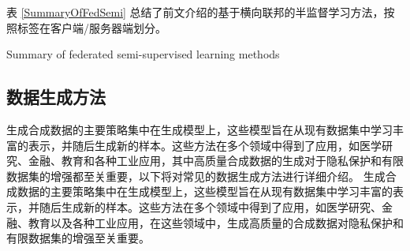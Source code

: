 表 \ref{SummaryOfFedSemi} 总结了前文介绍的基于横向联邦的半监督学习方法，按照标签在客户端/服务器端划分。

\begin{table}[h]
	
	\centering  %
	{\songti \wuhao Summary of federated semi-supervised learning methods}
	\label{SummaryOfFedSemi}
	
\end{table}


\subsection{数据生成方法}
生成合成数据的主要策略集中在生成模型上，这些模型旨在从现有数据集中学习丰富的表示，并随后生成新的样本。这些方法在多个领域中得到了应用，如医学研究、金融、教育和各种工业应用，其中高质量合成数据的生成对于隐私保护和有限数据集的增强都至关重要，以下将对常见的数据生成方法进行详细介绍。  
生成合成数据的主要策略集中在生成模型上，这些模型旨在从现有数据集中学习丰富的表示，并随后生成新的样本。这些方法在多个领域中得到了应用，如医学研究、金融、教育以及各种工业应用，在这些领域中，生成高质量的合成数据对隐私保护和有限数据集的增强至关重要。

